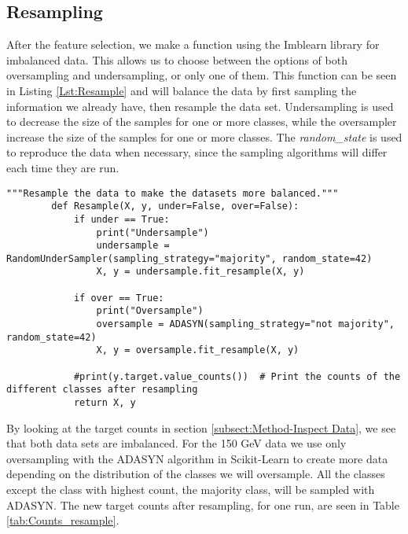\documentclass[a4paper, american, 12pt]{report}
\begin{document}
	\subsection{Resampling}
	\label{subsect:Method-Resampling}
	 After the feature selection, we make a function using the Imblearn library for imbalanced data. This allows us to choose between the options of both oversampling and undersampling, or only one of them. This function can be seen in Listing \ref{Lst:Resample} and will balance the data by first sampling the information we already have, then resample the data set. Undersampling is used to decrease the size of the samples for one or more classes, while the oversampler increase the size of the samples for one or more classes. The \textit{random\_state} is used to reproduce the data when necessary, since the sampling algorithms will differ each time they are run.
	\begin{lstlisting}[caption=Function for resampling data., label=Lst:Resample]
		"""Resample the data to make the datasets more balanced."""
		def Resample(X, y, under=False, over=False):
			if under == True:
				print("Undersample")
				undersample = RandomUnderSampler(sampling_strategy="majority", random_state=42)
				X, y = undersample.fit_resample(X, y)
		
			if over == True:
				print("Oversample")
				oversample = ADASYN(sampling_strategy="not majority", random_state=42)
				X, y = oversample.fit_resample(X, y)
		
			#print(y.target.value_counts())  # Print the counts of the different classes after resampling
			return X, y 
	\end{lstlisting}

	By looking at the target counts in section \ref{subsect:Method-Inspect Data}, we see that both data sets are imbalanced. For the 150 GeV data we use only oversampling with the ADASYN algorithm in Scikit-Learn to create more data depending on the distribution of the classes we will oversample. All the classes except the class with highest count, the majority class, will be sampled with ADASYN. The new target counts after resampling, for one run, are seen in Table \ref{tab:Counts_resample}.
	
\end{document}

